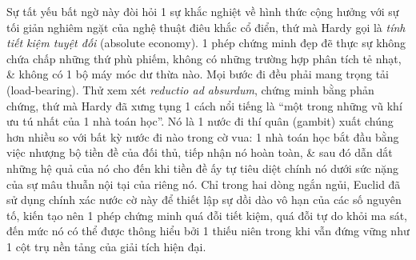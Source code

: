 \documentclass[11pt]{article}
\begin{document}
Sự tất yếu bất ngờ này đòi hỏi 1 sự khắc nghiệt về hình thức cộng hưởng với sự tối giản nghiêm ngặt của nghệ thuật điêu khắc cổ điển, thứ mà Hardy gọi là \emph{tính tiết kiệm tuyệt đối} (absolute economy). 1 phép chứng minh đẹp đẽ thực sự không chứa chấp những thứ phù phiếm, không có những trường hợp phân tích tẻ nhạt, \& không có 1 bộ máy móc dư thừa nào. Mọi bước đi đều phải mang trọng tải (load-bearing). Thử xem xét \textit{reductio ad absurdum}, chứng minh bằng phản chứng, thứ mà Hardy đã xưng tụng 1 cách nổi tiếng là ``một trong những vũ khí ưu tú nhất của 1 nhà toán học''. Nó là 1 nước đi thí quân (gambit) xuất chúng hơn nhiều so với bất kỳ nước đi nào trong cờ vua: 1 nhà toán học bắt đầu bằng việc nhượng bộ tiền đề của đối thủ, tiếp nhận nó hoàn toàn, \& sau đó dẫn dắt những hệ quả của nó cho đến khi tiền đề ấy tự tiêu diệt chính nó dưới sức nặng của sự mâu thuẫn nội tại của riêng nó. Chỉ trong hai dòng ngắn ngủi, Euclid đã sử dụng chính xác nước cờ này để thiết lập sự dồi dào vô hạn của các số nguyên tố, kiến tạo nên 1 phép chứng minh quá đỗi tiết kiệm, quá đỗi tự do khỏi ma sát, đến mức nó có thể được thông hiểu bởi 1 thiếu niên trong khi vẫn đứng vững như 1 cột trụ nền tảng của giải tích hiện đại.
\end{document}
